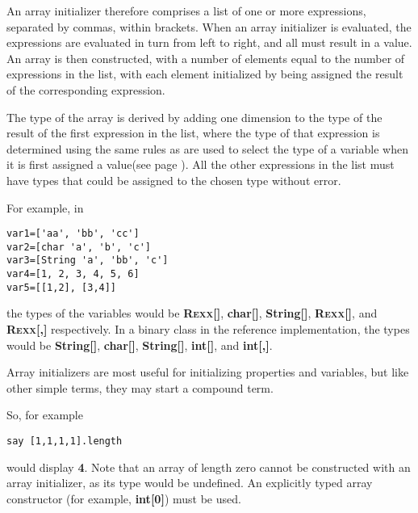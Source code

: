 An array initializer therefore comprises a list of one or more
expressions, separated by commas, within brackets.  When an array
initializer is evaluated, the expressions are evaluated in turn from
left to right, and all must result in a value.
An array is then constructed, with a number of elements
equal to the number of expressions in the list, with each element
initialized by being assigned the result of the corresponding
expression.
 
The type of the array is derived by adding one dimension to the type of
the result of the first expression in the list, where the type of that
expression is determined using the same rules as are used to select the
type of a variable when it is first  assigned a value(see page \pageref{refassign}).
All the other expressions in the list must have types that could be
assigned to the chosen type without error.
 
For example, in
\begin{lstlisting}
var1=['aa', 'bb', 'cc']
var2=[char 'a', 'b', 'c']
var3=[String 'a', 'bb', 'c']
var4=[1, 2, 3, 4, 5, 6]
var5=[[1,2], [3,4]]
\end{lstlisting}
the types of the variables would
be \textbf{R\textsc{exx}[]}, \textbf{char[]}, \textbf{String[]}, \textbf{R\textsc{exx}[]},
and \textbf{R\textsc{exx}[,]} respectively.
In a binary class in the reference implementation, the types would
be \textbf{String[]}, \textbf{char[]}, \textbf{String[]}, \textbf{int[]},
and \textbf{int[,]}.
 
Array initializers are most useful for initializing properties and
variables, but like other simple terms, they may start a compound term.
 
So, for example
\begin{lstlisting}
say [1,1,1,1].length
\end{lstlisting}
would display \textbf{4}.
 Note that an array of length zero cannot be constructed with an array
initializer, as its type would be undefined.  An explicitly typed array
constructor (for example, \textbf{int[0]}) must be used.
